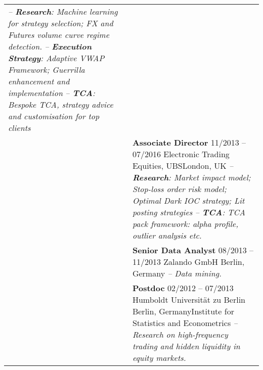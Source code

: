 \documentclass[a4paper,10pt]{article}
\begin{document}
\begin{longtable}[h]{p{}p{}}
    \emph{-- \textbf{Research}: Machine learning for strategy selection; FX and Futures volume curve regime detection.}\newline 
    \emph{-- \textbf{Execution Strategy}: Adaptive VWAP Framework; Guerrilla enhancement and implementation}\newline 
    \emph{-- \textbf{TCA}: Bespoke TCA, strategy advice and customisation for top clients}\\ 
  & \textbf{Associate Director} \hfill 11/2013 -- 07/2016 \newline Electronic Trading Equities, UBS\hfill London, UK\newline  
    \emph{-- \textbf{Research}: Market impact model; Stop-loss order risk model; Optimal Dark IOC strategy; Lit posting strategies}\newline
    \emph{-- \textbf{TCA}: TCA pack framework: alpha profile, outlier analysis etc.}\\
  & \textbf{Senior Data Analyst} \hfill 08/2013 -- 11/2013 \newline Zalando GmbH \hfill Berlin, Germany \newline  
  \emph{-- Data mining.} \\
  & \textbf{Postdoc} \hfill 02/2012 -- 07/2013 \newline Humboldt Universit\"at zu Berlin \hfill Berlin, Germany\newline Institute for Statistics and Econometrics \newline \emph{--Research on high-frequency trading and hidden liquidity in equity markets.} \\


\end{longtable}
\end{document}
